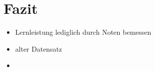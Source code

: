 \chapter[Fazit]{Fazit}


\begin{itemize}
    \item Lernleistung lediglich durch Noten bemessen
    \item alter Datensatz
    \item 
\end{itemize}